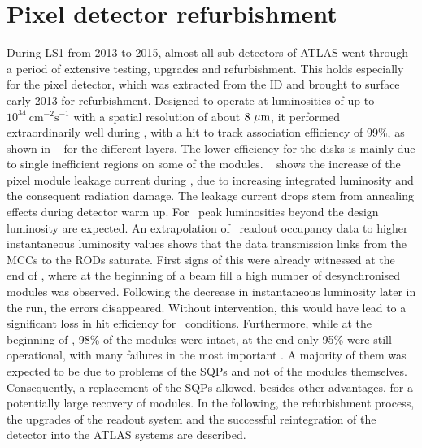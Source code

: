 \section{Pixel detector refurbishment}
\label{sec:pixeldetector}
During \gls{LS1} from 2013 to 2015, almost all sub-detectors of \gls{ATLAS} went through a period of extensive testing, upgrades and refurbishment. This holds especially for the pixel detector, which was extracted from the \gls{ID} and brought to surface early 2013 for refurbishment. 
%
Designed to operate at luminosities of up to $10^{34}~\mathrm{cm}^{-2}\mathrm{s}^{-1}$ with a spatial resolution of about $8~\mu\mathrm{m}$, it performed extraordinarily well during \RunOne, with a hit to track association efficiency of 99\%, as shown in \fig~ for the different layers. The lower efficiency for the disks is mainly due to single inefficient regions on some of the modules. 
%
\Fig~ shows the increase of the pixel module leakage current during \RunOne, due to increasing integrated luminosity and the consequent radiation damage. The leakage current drops stem from annealing effects during detector warm up. 
%
For \RunTwo\ peak luminosities beyond the design luminosity are expected. 
%
An extrapolation of \RunOne\ readout occupancy data to higher instantaneous luminosity values shows that the data transmission links from the \glspl{MCC} to the \glspl{ROD} saturate. First signs of this were already witnessed at the end of \RunOne, where at the beginning of a beam fill a high number of desynchronised modules was observed. Following the decrease in instantaneous luminosity later in the run, the errors disappeared. Without intervention, this would have lead to a significant loss in hit efficiency for \RunTwo\ conditions. 
%
Furthermore, while at the beginning of \RunOne, 98\% of the modules were intact, at the end only 95\% were still operational, with many failures in the most important \blayer. A majority of them was expected to be due to problems of the \glspl{SQP} and not of the modules themselves. Consequently, a replacement of the \glspl{SQP} allowed, besides other advantages, for a potentially large recovery of modules. 
%
In the following, the refurbishment process, the upgrades of the readout system and the successful reintegration of the detector into the \gls{ATLAS} systems are described. 
%
